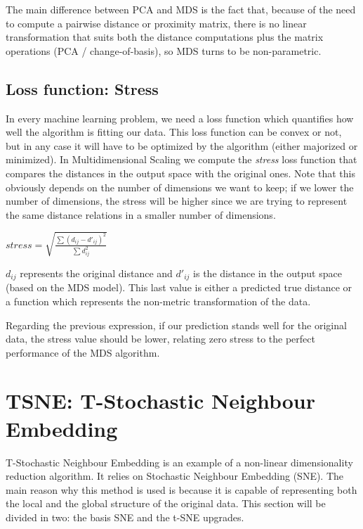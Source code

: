 \documentclass[a4paper,11pt,spanish]{report}
\begin{document}
The main difference between PCA and MDS is the fact that, because of the need to compute a pairwise distance or proximity matrix, there is no linear transformation that suits both the distance computations plus the matrix operations (PCA / change-of-basis), so MDS turns to be non-parametric.

\subsection{Loss function: Stress}
\label{ssec:str}

In every machine learning problem, we need a loss function which quantifies how well the algorithm is fitting our data. This loss function can be convex or not, but in any case it will have to be optimized by the algorithm (either majorized or minimized). In Multidimensional Scaling we compute the \textit{stress} loss function that compares the distances in the output space with the original ones. Note that this obviously depends on the number of dimensions we want to keep; if we lower the number of dimensions, the stress will be higher since we are trying to represent the same distance relations in a smaller number of dimensions.

\begin{center}
\( \textit{stress} = \sqrt{\frac{\sum(d_{ij}-d'_{ij})^{2}}{\sum d_{ij}^{2}} } \)
\end{center}

$d_{ij}$ represents the original distance and $d'_{ij}$ is the distance in the output space (based on the MDS model). This last value is either a predicted true distance or a function which represents the non-metric transformation of the data.

Regarding the previous expression, if our prediction stands well for the original data, the stress value should be lower, relating zero stress to the perfect performance of the MDS  algorithm.

\section{TSNE: T-Stochastic Neighbour Embedding}
\label{sec:tsne}

T-Stochastic Neighbour Embedding \citep{tsne} is an example of a non-linear dimensionality reduction algorithm. It relies on Stochastic Neighbour Embedding (SNE). The main reason why this method is used is because it is capable of representing both the local and the global structure of the original data. This section will be divided in two: the basis SNE and the t-SNE upgrades.
\end{document}
